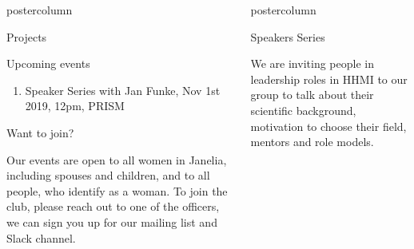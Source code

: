 \documentclass{beamer}
\newlength{\columnheight}
\begin{document}
\begin{frame}
\begin{columns}
\begin{column}{.33\textwidth}
\begin{beamercolorbox}[center,wd=\textwidth]{postercolumn}
\begin{minipage}[T]{.95\textwidth}
{\begin{myblock}{Projects}
                    \end{myblock}
                    \begin{myblock}{Upcoming events}
                        \begin{addmargin}[1em]{1em}
                            \begin{enumerate}
                                \item Speaker Series with Jan Funke, Nov 1st
2019, 12pm, PRISM
                            \end{enumerate}
                        \end{addmargin}
                    \end{myblock}
                    \vspace{1.25cm}
                    \begin{myblock}{Want to join?}
                        \begin{addmargin}[1em]{1em}
                            Our events are open to all women in Janelia, including spouses and children, and to all people, who identify as a woman.\newline
                            To join the club, please reach out to one of the officers, we can sign you up for our mailing list and Slack channel.
                        \end{addmargin}
                    \end{myblock}
                }
		    \end{minipage}\end{beamercolorbox}
  \end{column}
	\begin{column}{.33\textwidth}
		\begin{beamercolorbox}[center,wd=\textwidth]{postercolumn}
			\begin{minipage}[T]{.95\textwidth}
				\parbox[t][\columnheight]{\textwidth}{
					\begin{myblock}{Speakers Series}
            \begin{addmargin}[1em]{1em}
                We are inviting people in leadership roles in HHMI to our group to talk about their scientific background, motivation to choose their field, mentors and role models.
                \vspace{1cm}
            \end{addmargin}
            \begin{addmargin}[1em]{1em}
                \begin{minipage}{0.49\linewidth}

\end{minipage}
\end{addmargin}
\end{myblock}}
\end{minipage}
\end{beamercolorbox}
\end{column}
\end{columns}
\end{frame}
\end{document}
